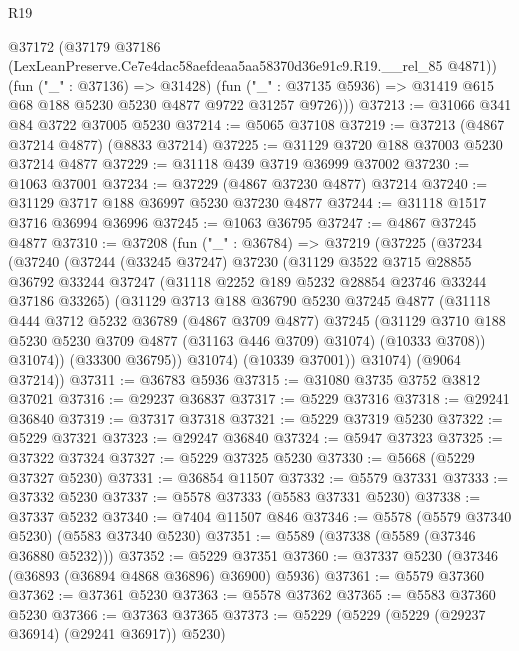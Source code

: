 \begin{lexlean}{R19}
\begin{coremodule}
      @37172
        (@37179 @37186 (LexLeanPreserve.Ce7e4dac58aefdeaa5aa58370d36e91c9.R19.__rel_85 @4871))
        (fun ("_" : @37136) => @31428)
        (fun ("_" : @37135 @5936) => @31419 @615 @68 @188 @5230 @5230 @4877 @9722 @31257 @9726)))
@37213 := @31066 @341 @84 @3722 @37005 @5230
@37214 := @5065 @37108
@37219 := @37213 (@4867 @37214 @4877) (@8833 @37214)
@37225 := @31129 @3720 @188 @37003 @5230 @37214 @4877
@37229 := @31118 @439 @3719 @36999 @37002
@37230 := @1063 @37001
@37234 := @37229 (@4867 @37230 @4877) @37214
@37240 := @31129 @3717 @188 @36997 @5230 @37230 @4877
@37244 := @31118 @1517 @3716 @36994 @36996
@37245 := @1063 @36795
@37247 := @4867 @37245 @4877
@37310 := @37208
    (fun ("_" : @36784) =>
    @37219
      (@37225
        (@37234
          (@37240
            (@37244
              (@33245 @37247)
              @37230
              (@31129
                @3522
                @3715
                @28855
                @36792
                @33244
                @37247
                (@31118 @2252 @189 @5232 @28854 @23746 @33244 @37186 @33265)
                (@31129
                  @3713
                  @188
                  @36790
                  @5230
                  @37245
                  @4877
                  (@31118
                    @444
                    @3712
                    @5232
                    @36789
                    (@4867 @3709 @4877)
                    @37245
                    (@31129 @3710 @188 @5230 @5230 @3709 @4877 (@31163 @446 @3709) @31074)
                    (@10333 @3708))
                  @31074))
              (@33300 @36795))
            @31074)
          (@10339 @37001))
        @31074)
      (@9064 @37214))
@37311 := @36783 @5936
@37315 := @31080 @3735 @3752 @3812 @37021
@37316 := @29237 @36837
@37317 := @5229 @37316
@37318 := @29241 @36840
@37319 := @37317 @37318
@37321 := @5229 @37319 @5230
@37322 := @5229 @37321
@37323 := @29247 @36840
@37324 := @5947 @37323
@37325 := @37322 @37324
@37327 := @5229 @37325 @5230
@37330 := @5668 (@5229 @37327 @5230)
@37331 := @36854 @11507
@37332 := @5579 @37331
@37333 := @37332 @5230
@37337 := @5578 @37333 (@5583 @37331 @5230)
@37338 := @37337 @5232
@37340 := @7404 @11507 @846
@37346 := @5578 (@5579 @37340 @5230) (@5583 @37340 @5230)
@37351 := @5589 (@37338 (@5589 (@37346 @36880 @5232)))
@37352 := @5229 @37351
@37360 := @37337 @5230 (@37346 (@36893 (@36894 @4868 @36896) @36900) @5936)
@37361 := @5579 @37360
@37362 := @37361 @5230
@37363 := @5578 @37362
@37365 := @5583 @37360 @5230
@37366 := @37363 @37365
@37373 := @5229 (@5229 (@5229 (@29237 @36914) (@29241 @36917)) @5230)

\end{coremodule}
\end{lexlean}
